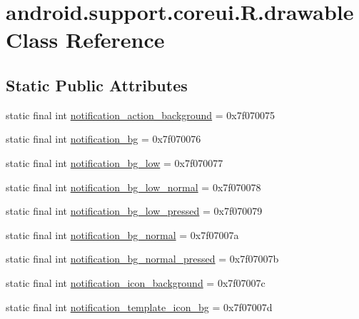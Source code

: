 \hypertarget{classandroid_1_1support_1_1coreui_1_1_r_1_1drawable}{}\section{android.\+support.\+coreui.\+R.\+drawable Class Reference}
\label{classandroid_1_1support_1_1coreui_1_1_r_1_1drawable}
\subsection*{Static Public Attributes}
\begin{DoxyCompactItemize}
\item 
static final int \mbox{\hyperlink{classandroid_1_1support_1_1coreui_1_1_r_1_1drawable_a82491dac97c48bc1455f0385a70b2ddf}{notification\+\_\+action\+\_\+background}} = 0x7f070075
\item 
static final int \mbox{\hyperlink{classandroid_1_1support_1_1coreui_1_1_r_1_1drawable_a1c8146145db024a50e235921fc2cc2da}{notification\+\_\+bg}} = 0x7f070076
\item 
static final int \mbox{\hyperlink{classandroid_1_1support_1_1coreui_1_1_r_1_1drawable_a95fb51d823631a171628dbd2f001a6bf}{notification\+\_\+bg\+\_\+low}} = 0x7f070077
\item 
static final int \mbox{\hyperlink{classandroid_1_1support_1_1coreui_1_1_r_1_1drawable_afe30750d9bfc3bfd5420ea52b84dfb4e}{notification\+\_\+bg\+\_\+low\+\_\+normal}} = 0x7f070078
\item 
static final int \mbox{\hyperlink{classandroid_1_1support_1_1coreui_1_1_r_1_1drawable_a5e3dd2843d22fa341656b1fe71764f0d}{notification\+\_\+bg\+\_\+low\+\_\+pressed}} = 0x7f070079
\item 
static final int \mbox{\hyperlink{classandroid_1_1support_1_1coreui_1_1_r_1_1drawable_abcb37071db3c22f947558bb671447744}{notification\+\_\+bg\+\_\+normal}} = 0x7f07007a
\item 
static final int \mbox{\hyperlink{classandroid_1_1support_1_1coreui_1_1_r_1_1drawable_ae6e843ccd22ef31f6234459f7a677a66}{notification\+\_\+bg\+\_\+normal\+\_\+pressed}} = 0x7f07007b
\item 
static final int \mbox{\hyperlink{classandroid_1_1support_1_1coreui_1_1_r_1_1drawable_ab86830b1048554d986d5aa69cd4630f4}{notification\+\_\+icon\+\_\+background}} = 0x7f07007c
\item 
static final int \mbox{\hyperlink{classandroid_1_1support_1_1coreui_1_1_r_1_1drawable_a07e55740f0809357a6cca5a6f96f383b}{notification\+\_\+template\+\_\+icon\+\_\+bg}} = 0x7f07007d

\end{DoxyCompactItemize}
